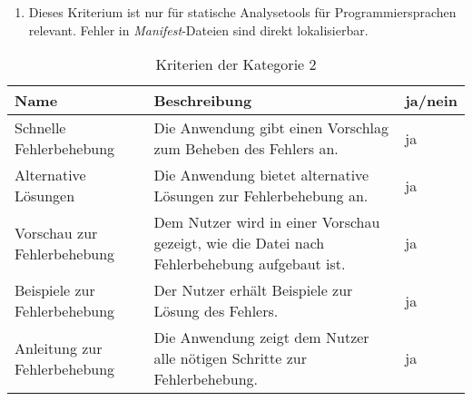 \begin{enumerate}[label= (\arabic*)]
    \item Dieses Kriterium ist nur für statische Analysetools für Programmiersprachen relevant. Fehler in \textit{Manifest}-Dateien sind direkt lokalisierbar.
\end{enumerate}

\FloatBarrier

\begin{table}[htp]
    \centering
    \begin{tabularx}{\columnwidth}{lXl}
        \toprule
        \textbf{Name}                & \textbf{Beschreibung}                                                                       & \textbf{ja/nein} \\
        \midrule
        Schnelle Fehlerbehebung      & Die Anwendung gibt einen Vorschlag zum Beheben des Fehlers an.                              & ja               \\
        \midrule
        Alternative Lösungen         & Die Anwendung bietet alternative Lösungen zur Fehlerbehebung an.                            & ja               \\
        \midrule
        Vorschau zur Fehlerbehebung  & Dem Nutzer wird in einer Vorschau gezeigt, wie die Datei nach Fehlerbehebung aufgebaut ist. & ja               \\
        \midrule
        Beispiele zur Fehlerbehebung & Der Nutzer erhält Beispiele zur Lösung des Fehlers.                                         & ja               \\
        \midrule
        Anleitung zur Fehlerbehebung & Die Anwendung zeigt dem Nutzer alle nötigen Schritte zur Fehlerbehebung.                    & ja               \\
        \bottomrule
    \end{tabularx}
    \caption{Kriterien der Kategorie 2}
    \label{tbl:criteria-category-2}
\end{table}

